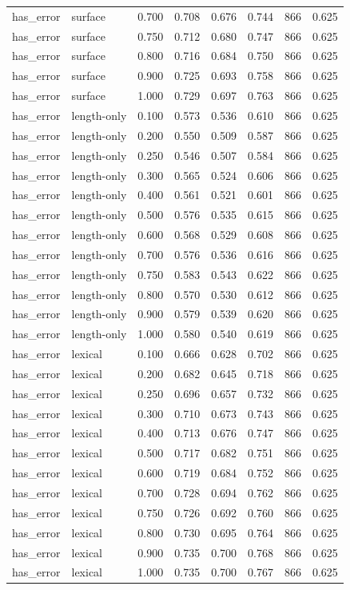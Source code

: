 \begin{tabular}{llrrrrrr}
has_error & surface & 0.700 & 0.708 & 0.676 & 0.744 & 866 & 0.625 \\
has_error & surface & 0.750 & 0.712 & 0.680 & 0.747 & 866 & 0.625 \\
has_error & surface & 0.800 & 0.716 & 0.684 & 0.750 & 866 & 0.625 \\
has_error & surface & 0.900 & 0.725 & 0.693 & 0.758 & 866 & 0.625 \\
has_error & surface & 1.000 & 0.729 & 0.697 & 0.763 & 866 & 0.625 \\
has_error & length-only & 0.100 & 0.573 & 0.536 & 0.610 & 866 & 0.625 \\
has_error & length-only & 0.200 & 0.550 & 0.509 & 0.587 & 866 & 0.625 \\
has_error & length-only & 0.250 & 0.546 & 0.507 & 0.584 & 866 & 0.625 \\
has_error & length-only & 0.300 & 0.565 & 0.524 & 0.606 & 866 & 0.625 \\
has_error & length-only & 0.400 & 0.561 & 0.521 & 0.601 & 866 & 0.625 \\
has_error & length-only & 0.500 & 0.576 & 0.535 & 0.615 & 866 & 0.625 \\
has_error & length-only & 0.600 & 0.568 & 0.529 & 0.608 & 866 & 0.625 \\
has_error & length-only & 0.700 & 0.576 & 0.536 & 0.616 & 866 & 0.625 \\
has_error & length-only & 0.750 & 0.583 & 0.543 & 0.622 & 866 & 0.625 \\
has_error & length-only & 0.800 & 0.570 & 0.530 & 0.612 & 866 & 0.625 \\
has_error & length-only & 0.900 & 0.579 & 0.539 & 0.620 & 866 & 0.625 \\
has_error & length-only & 1.000 & 0.580 & 0.540 & 0.619 & 866 & 0.625 \\
has_error & lexical & 0.100 & 0.666 & 0.628 & 0.702 & 866 & 0.625 \\
has_error & lexical & 0.200 & 0.682 & 0.645 & 0.718 & 866 & 0.625 \\
has_error & lexical & 0.250 & 0.696 & 0.657 & 0.732 & 866 & 0.625 \\
has_error & lexical & 0.300 & 0.710 & 0.673 & 0.743 & 866 & 0.625 \\
has_error & lexical & 0.400 & 0.713 & 0.676 & 0.747 & 866 & 0.625 \\
has_error & lexical & 0.500 & 0.717 & 0.682 & 0.751 & 866 & 0.625 \\
has_error & lexical & 0.600 & 0.719 & 0.684 & 0.752 & 866 & 0.625 \\
has_error & lexical & 0.700 & 0.728 & 0.694 & 0.762 & 866 & 0.625 \\
has_error & lexical & 0.750 & 0.726 & 0.692 & 0.760 & 866 & 0.625 \\
has_error & lexical & 0.800 & 0.730 & 0.695 & 0.764 & 866 & 0.625 \\
has_error & lexical & 0.900 & 0.735 & 0.700 & 0.768 & 866 & 0.625 \\
has_error & lexical & 1.000 & 0.735 & 0.700 & 0.767 & 866 & 0.625 \\
\bottomrule
\end{tabular}
